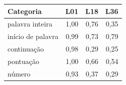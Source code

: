 \begin{tabular}{lrrr}
\toprule
Categoria & L01 & L18 & L36 \\
\midrule
palavra inteira & 1,00 & 0,76 & 0,35 \\
início de palavra & 0,99 & 0,73 & 0,79 \\
continuação & 0,98 & 0,29 & 0,25 \\
pontuação & 1,00 & 0,66 & 0,54 \\
número & 0,93 & 0,37 & 0,29 \\
\bottomrule
\end{tabular}
